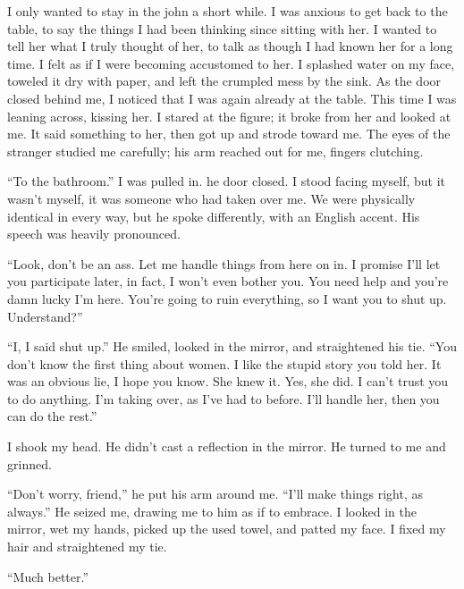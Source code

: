 I only wanted to stay in the john a short while. I was anxious to get
back to the table, to say the things I had been thinking since sitting
with her. I wanted to tell her what I truly thought of her, to talk as
though I had known her for a long time. I felt as if I were becoming
accustomed to her. I splashed water on my face, toweled it dry with
paper, and left the crumpled mess by the sink. As the door closed behind
me, I noticed that I was again already at the table. This time I was
leaning across, kissing her. I stared at the figure; it broke from her
and looked at me. It said something to her, then got up and strode
toward me. The eyes of the stranger studied me carefully; his arm
reached out for me, fingers clutching.

``To the bathroom.'' I was pulled in. he door closed. I stood facing
myself, but it wasn't myself, it was someone who had taken over me. We
were physically identical in every way, but he spoke differently, with
an English accent. His speech was heavily pronounced.

``Look, don't be an ass. Let me handle things from here on in. I promise
I'll let you participate later, in fact, I won't even bother you. You
need help and you're damn lucky I'm here. You're going to ruin
everything, so I want you to shut up. Understand?''

``I, I said shut up.'' He smiled, looked in the mirror, and straightened
his tie. ``You don't know the first thing about women. I like the stupid
story you told her. It was an obvious lie, I hope you know. She knew it.
Yes, she did. I can't trust you to do anything. I'm taking over, as I've
had to before. I'll handle her, then you can do the rest.''

I shook my head. He didn't cast a reflection in the mirror. He turned to
me and grinned.

``Don't worry, friend,'' he put his arm around me. ``I'll make things
right, as always.'' He seized me, drawing me to him as if to embrace. I
looked in the mirror, wet my hands, picked up the used towel, and patted
my face. I fixed my hair and straightened my tie.

``Much better.''

